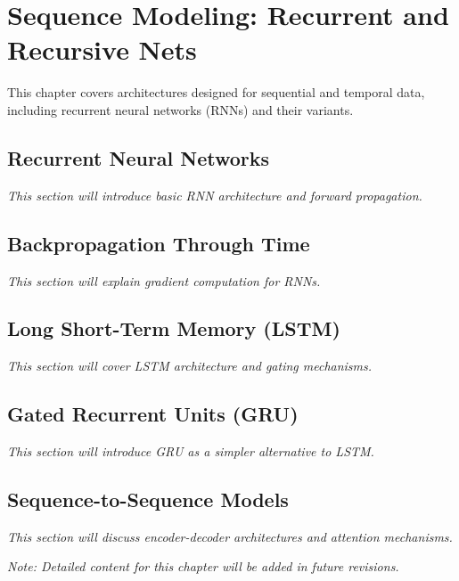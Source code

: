 
\chapter{Sequence Modeling: Recurrent and Recursive Nets}
\label{chap:sequence-modeling}

This chapter covers architectures designed for sequential and temporal data, including recurrent neural networks (RNNs) and their variants.

\section{Recurrent Neural Networks}

\textit{This section will introduce basic RNN architecture and forward propagation.}

\section{Backpropagation Through Time}

\textit{This section will explain gradient computation for RNNs.}

\section{Long Short-Term Memory (LSTM)}

\textit{This section will cover LSTM architecture and gating mechanisms.}

\section{Gated Recurrent Units (GRU)}

\textit{This section will introduce GRU as a simpler alternative to LSTM.}

\section{Sequence-to-Sequence Models}

\textit{This section will discuss encoder-decoder architectures and attention mechanisms.}

\vspace{1em}
\noindent\textit{Note: Detailed content for this chapter will be added in future revisions.}
